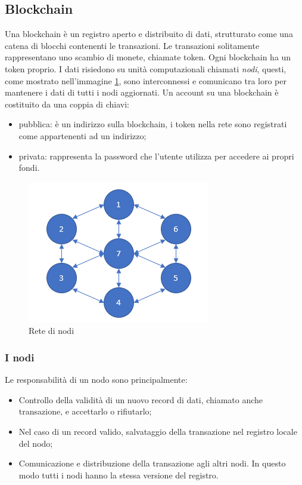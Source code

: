 \documentclass[a4paper]{article}
\begin{document}
    \subsection{Blockchain}
    Una blockchain è un registro aperto e distribuito di dati, strutturato come una catena di blocchi contenenti le transazioni.
    Le transazioni solitamente rappresentano uno scambio di monete, chiamate token. Ogni blockchain ha un token proprio.
    I dati risiedono su unità computazionali chiamati \emph{nodi}, questi, come mostrato nell'immagine \ref{fig:node},
    sono interconnessi e comunicano tra loro per mantenere i dati di tutti i nodi aggiornati\cite{nodo}.
    Un account su una blockchain è costituito da una coppia di chiavi:
    \begin{itemize}
      \item pubblica: è un indirizzo sulla blockchain, i token nella rete sono registrati come appartenenti ad un indirizzo;
      \item privata: rappresenta la password che l'utente utilizza per accedere ai propri fondi.
    \end{itemize}
    \begin{figure}[ht]
      \includegraphics[scale=0.8, fbox]{node.png}
      \centering
      \caption{Rete di nodi}
      \centering
      \label{fig:node}
    \end{figure}
    \subsubsection{I nodi}
    Le responsabilità di un nodo sono principalmente:
    \begin{itemize}
      \item Controllo della validità di un nuovo record di dati, chiamato anche transazione, e accettarlo o rifiutarlo;
      \item Nel caso di un record valido, salvataggio della transazione nel registro locale del nodo;
      \item Comunicazione e distribuzione della transazione agli altri nodi. In questo modo tutti i nodi hanno la stessa versione del registro.
    \end{itemize}
\end{document}
